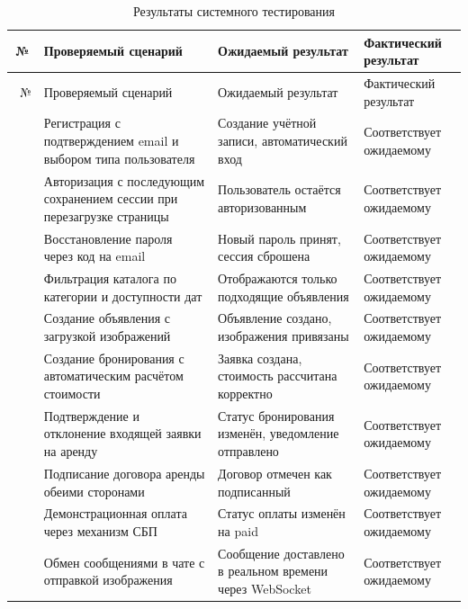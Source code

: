 \begin{xltabular}{\textwidth}{|c|X|X|X|}
	\caption{Результаты системного тестирования \label{tab:sys_test}}\\ \hline
	\centrow № & \centrow Проверяемый сценарий & \centrow Ожидаемый результат & \centrow Фактический результат \\ \hline
	\endfirsthead
	~\centrow № & \centrow Проверяемый сценарий & \centrow Ожидаемый результат & \centrow Фактический результат \\ \hline
	\finishhead
	 & \leftrow Регистрация с подтверждением email и выбором типа пользователя & \leftrow Создание учётной записи, автоматический вход & \leftrow Соответствует ожидаемому \\ \hline
	 & \leftrow Авторизация с последующим сохранением сессии при перезагрузке страницы & \leftrow Пользователь остаётся авторизованным & \leftrow Соответствует ожидаемому \\ \hline
	 & \leftrow Восстановление пароля через код на email & \leftrow Новый пароль принят, сессия сброшена & \leftrow Соответствует ожидаемому \\ \hline
	 & \leftrow Фильтрация каталога по категории и доступности дат & \leftrow Отображаются только подходящие объявления & \leftrow Соответствует ожидаемому \\ \hline
	 & \leftrow Создание объявления с загрузкой изображений & \leftrow Объявление создано, изображения привязаны & \leftrow Соответствует ожидаемому \\ \hline
	 & \leftrow Создание бронирования с автоматическим расчётом стоимости & \leftrow Заявка создана, стоимость рассчитана корректно & \leftrow Соответствует ожидаемому \\ \hline
	 & \leftrow Подтверждение и отклонение входящей заявки на аренду & \leftrow Статус бронирования изменён, уведомление отправлено & \leftrow Соответствует ожидаемому \\ \hline
	 & \leftrow Подписание договора аренды обеими сторонами & \leftrow Договор отмечен как подписанный & \leftrow Соответствует ожидаемому \\ \hline
	 & \leftrow Демонстрационная оплата через механизм СБП & \leftrow Статус оплаты изменён на paid & \leftrow Соответствует ожидаемому \\ \hline
	 & \leftrow Обмен сообщениями в чате с отправкой изображения & \leftrow Сообщение доставлено в реальном времени через WebSocket & \leftrow Соответствует ожидаемому \\ \hline

\end{xltabular}
